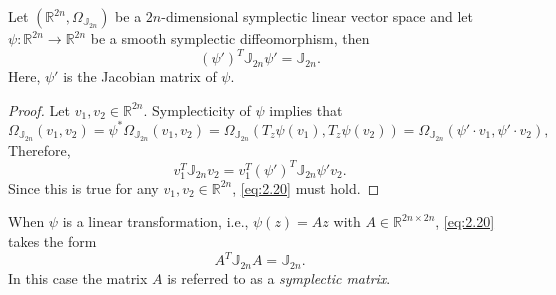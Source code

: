 \begin{proposition}
Let $(\mathbb R^{2n}, \Omega_{\mathbb J_{2n}})$ be a $2n$-dimensional symplectic linear vector space and let $\psi:\mathbb R^{2n} \to \mathbb R^{2n}$ be a smooth symplectic diffeomorphism, then
\begin{equation} \label{eq:2.20}
	(\psi')^T \mathbb J_{2n} \psi' =  \mathbb J_{2n}.	
\end{equation}
Here, $\psi'$ is the Jacobian matrix of $\psi$.
\end{proposition}
\begin{proof}
Let $v_1,v_2\in \mathbb R^{2n}$. Symplecticity of $\psi$ implies that
\begin{equation*}
	\Omega_{\mathbb J_{2n}}(v_1,v_2) = \psi^*\Omega_{\mathbb J_{2n}}(v_1,v_2) = \Omega_{\mathbb J_{2n}}( T_z \psi(v_1) , T_z \psi (v_2) ) = \Omega_{\mathbb J_{2n}}( \psi'\cdot v_1,\psi'\cdot v_2 ),
\end{equation*}
Therefore,
\begin{equation*}
	v_1^T \mathbb J_{2n} v_2 = v_1^T (\psi')^T \mathbb J_{2n} \psi' v_2.
\end{equation*}
Since this is true for any $v_1,v_2\in \mathbb R^{2n}$, \eqref{eq:2.20} must hold.
\end{proof}
\begin{definition}
When $\psi$ is a linear transformation, i.e., $\psi(z) = Az$ with $A\in \mathbb R^{2n\times 2n}$, \eqref{eq:2.20} takes the form
\begin{equation} \label{eq:2.201}
	A^T \mathbb J_{2n} A = \mathbb J_{2n}.
\end{equation}
In this case the matrix $A$ is referred to as a \emph{symplectic matrix}.
\end{definition}

